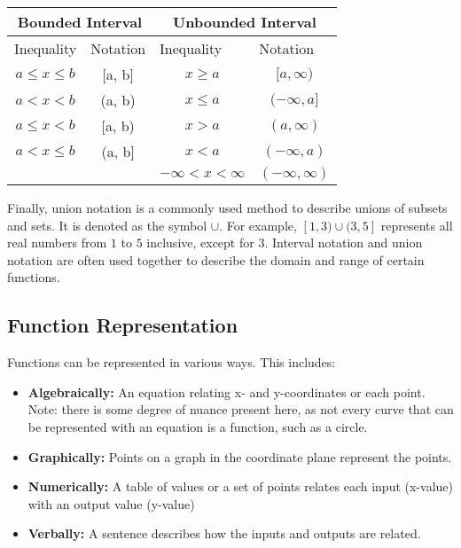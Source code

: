 \documentclass{article}
\begin{document}
\begin{table}[H]
\centering
\begin{tabular}{|cc|cc|}
\hline
\multicolumn{2}{|c|}{Bounded Interval} & \multicolumn{2}{c|}{Unbounded Interval} \\ \hline
\multicolumn{1}{|l|}{Inequality} & \multicolumn{1}{l|}{Notation} & \multicolumn{1}{l|}{Inequality} & \multicolumn{1}{l|}{Notation} \\ \hline
\multicolumn{1}{|c|}{$a \leq x \leq b$} & {[}a, b{]} & \multicolumn{1}{c|}{$x \geq a$} & $[a, \infty)$ \\
\multicolumn{1}{|c|}{$a < x < b$} & (a, b)     & \multicolumn{1}{c|}{$x \leq a$} & $(-\infty,a{]}$  \\
\multicolumn{1}{|c|}{$a \leq x < b$} & {[}a, b)   & \multicolumn{1}{c|}{$x > a$} & $(a, \infty)$   \\
\multicolumn{1}{|c|}{$a < x \leq b$}& (a, b{]}& \multicolumn{1}{c|}{$x < a$} & $(-\infty, a)$\\
\multicolumn{1}{|c|}{}           &                               & \multicolumn{1}{c|}{$-\infty < x < \infty$}          & $(-\infty, \infty)$                            \\ \hline
\end{tabular}
\end{table}

Finally, union notation is a commonly used method to describe unions of subsets and sets. It is denoted as the symbol $\cup$. For example, $[1, 3)\cup(3, 5]$ represents all real numbers from $1$ to $5$ inclusive, except for $3$. Interval notation and union notation are often used together to describe the domain and range of certain functions.

\subsection{Function Representation}

Functions can be represented in various ways. This includes:

\begin{itemize}
    \item \textbf{Algebraically:} An equation relating x- and y-coordinates or each point. Note: there is some degree of nuance present here, as not every curve that can be represented with an equation is a function, such as a circle.
    \item \textbf{Graphically:} Points on a graph in the coordinate plane represent the points.
    \item \textbf{Numerically:} A table of values or a set of points relates each input (x-value) with an output value (y-value)
    \item \textbf{Verbally:} A sentence describes how the inputs and outputs are related.
\end{itemize}
\end{document}
